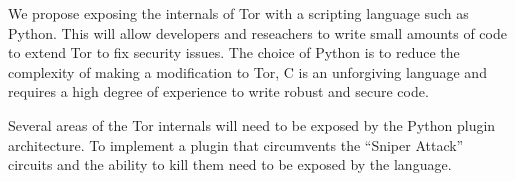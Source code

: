 \documentclass[9pt,technote]{IEEEtran}
\begin{document}
We propose exposing the internals of Tor with a scripting language such as
Python. This will allow developers and reseachers to write small amounts of code to extend Tor to fix security issues. The choice of Python is to reduce the complexity of making a modification to Tor, C is an unforgiving language and requires a high degree of experience to write robust and secure code.

Several areas of the Tor internals will need to be exposed by the Python plugin
architecture. To implement a plugin that circumvents the ``Sniper Attack''
circuits and the ability to kill them need to be exposed by the language.



\end{document}
